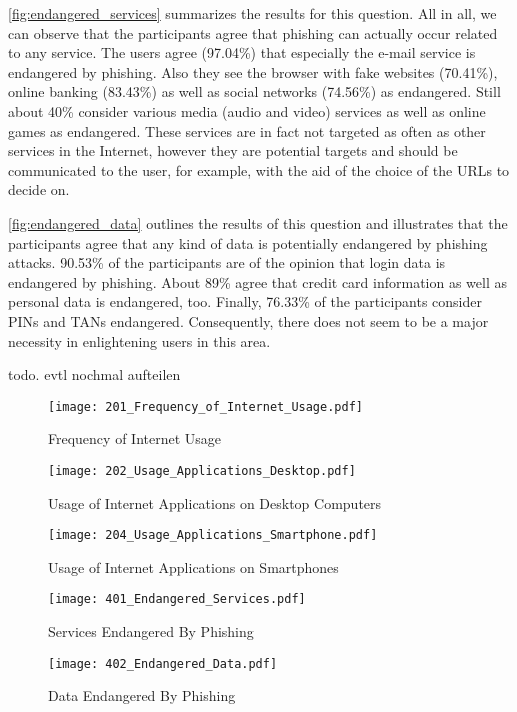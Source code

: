 \begin{description}[leftmargin=0cm]
	\item[Services endangered by phishing] \autoref{fig:endangered_services} summarizes the results for this question.
 All in all, we can observe that the participants agree that phishing can actually occur related to any service.
 The users agree (97.04\%) that especially the e-mail service is endangered by phishing.
 Also they see the browser with fake websites (70.41\%), online banking (83.43\%) as well as social networks (74.56\%) as endangered.
 Still about 40\% consider various media (audio and video) services as well as online games as endangered.
 These services are in fact not targeted as often as other services in the Internet, however they are potential targets and should be communicated to the user, for example, with the aid of the choice of the URLs to decide on.

	\item[Data endangered by phishing] \autoref{fig:endangered_data} outlines the results of this question and illustrates that the participants agree that any kind of data is potentially endangered by phishing attacks.
 90.53\% of the participants are of the opinion that login data is endangered by phishing.
 About 89\% agree that credit card information as well as personal data is endangered, too.
 Finally, 76.33\% of the participants consider PINs and TANs endangered.
 Consequently, there does not seem to be a major necessity in enlightening users in this area.

	\item[Preferences for an education app] todo.
 evtl nochmal aufteilen
\end{description}


\begin{figure}[hHtbp]
\centering
\texttt{[image: 201\_Frequency\_of\_Internet\_Usage.pdf]}
\caption{Frequency of Internet Usage}
\label{fig:internet_usage}
\end{figure}


\begin{figure}[hHtbp]
\centering
\texttt{[image: 202\_Usage\_Applications\_Desktop.pdf]}%
\caption{Usage of Internet Applications on Desktop Computers}%
\label{fig:desktop_apps}%
\end{figure}

\begin{figure}[hHtbp]
\texttt{[image: 204\_Usage\_Applications\_Smartphone.pdf]}%
\caption{Usage of Internet Applications on Smartphones}%
\label{fig:smartphone_apps}%
\end{figure}

\begin{figure}[hHtbp]
\texttt{[image: 401\_Endangered\_Services.pdf]}%
\caption{Services Endangered By Phishing}%
\label{fig:endangered_services}%
\end{figure}

\begin{figure}[hHtbp]
\texttt{[image: 402\_Endangered\_Data.pdf]}%
\caption{Data Endangered By Phishing}%
\label{fig:endangered_data}%
\end{figure}

